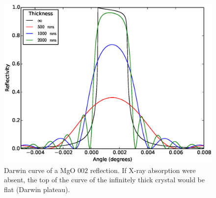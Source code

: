 \documentclass[12pt,oneside,notitlepage,abstracton,a4paper]{scrartcl}
\begin{document}
\begin{figure}[h]
\begin{center}
\includegraphics[width=12 cm]{pics/dynamical.eps}
\caption{Darwin curve of a MgO $002$ reflection. If X-ray absorption were absent, the top of the curve of the infinitely thick crystal would be flat (Darwin plateau).}
\label{dyn}
\end{center}
\end{figure}


\newpage
\end{document}
